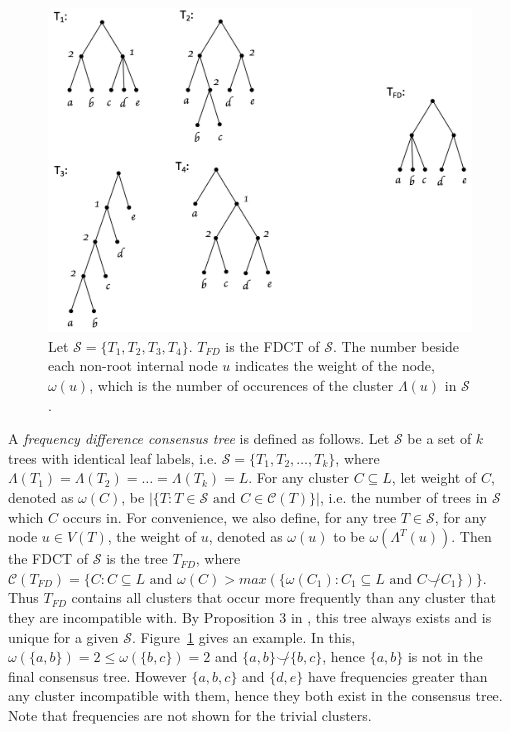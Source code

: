\documentclass[final,1p,times]{elsarticle}
\newcommand{\compatible}{\smile}
\newcommand{\leafset}{\Lambda}
\newcommand{\weight}{\omega}
\begin{document}
    \begin{figure}[ht]
        \includegraphics[scale=0.5]{freqdiff}
        \centering
        \caption[Example of a frequency difference consensus tree]{Let $\mathcal{S} = \{T_1, T_2, T_3, T_4\}$. $T_{FD}$ is the FDCT of $\mathcal{S}$. The number beside each non-root internal node $u$ indicates the weight of the node, $\weight(u)$, which is the number of occurences of the cluster $\leafset(u)$ in $\mathcal{S}$.}
        \label{fig:freqdiff}
    \end{figure}

    A \textit{frequency difference consensus tree} is defined as follows. Let $\mathcal{S}$ be a set of $k$ trees with identical leaf labels, i.e. $\mathcal{S} = \{T_1, T_2, \ldots, T_k\}$, where $\leafset(T_1) = \leafset(T_2) = \ldots = \leafset(T_k) = L$. For any cluster $C \subseteq L$, let weight of $C$, denoted as $\weight(C)$, be $|\{T : T \in \mathcal{S} \text{ and } C \in \mathcal{C}(T)\}|$, i.e. the number of trees in $\mathcal{S}$ which $C$ occurs in. For convenience, we also define, for any tree $T \in \mathcal{S}$, for any node $u \in V(T)$, the weight of $u$, denoted as $\weight(u)$ to be $\weight(\leafset^{T}(u))$. Then the FDCT of $\mathcal{S}$ is the tree $T_{FD}$, where $\mathcal{C}(T_{FD}) = \{C : C \subseteq L \text{ and } \weight(C) > max(\{\weight(C_1) : C_1 \subseteq L \text{ and } C \not\compatible C_1\})\}$. Thus $T_{FD}$ contains all clusters that occur more frequently than any cluster that they are incompatible with. By Proposition $3$ in \cite{steel2014axiomatic}, this tree always exists and is unique for a given $\mathcal{S}$. Figure~\ref{fig:freqdiff} gives an example. In this, $\weight(\{a, b\}) = 2 \leq \weight(\{b, c\}) = 2$ and $\{a, b\} \not\compatible \{b, c\}$, hence $\{a, b\}$ is not in the final consensus tree. However $\{a, b, c\}$ and $\{d, e\}$ have frequencies greater than any cluster incompatible with them, hence they both exist in the consensus tree. Note that frequencies are not shown for the trivial clusters.
\end{document}
